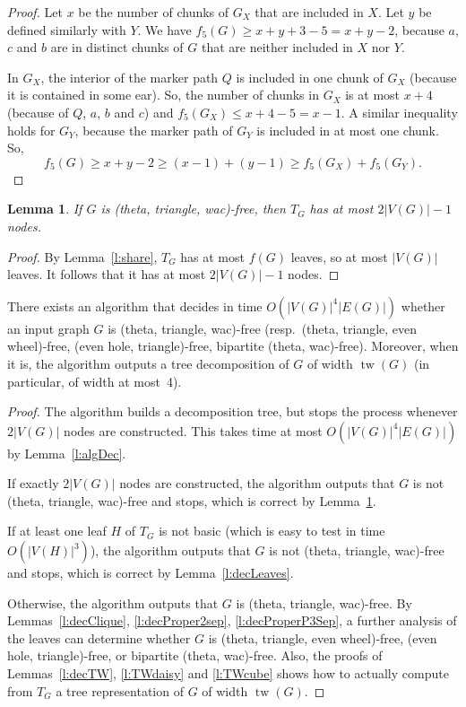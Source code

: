 \documentclass[11pt]{article}
\newtheorem{lemma}[theo]{Lemma}
\DeclareMathOperator{\tw}{tw}
\begin{document}
\begin{proof}
  Let $x$  be the number of chunks of $G_X$ that are included in $X$. Let $y$ be defined similarly with  $Y$. 
  We have $f_5(G) \geq x+y+3-5 = x + y - 2$, because $a$, $c$ and $b$ are in distinct chunks of $G$ that are neither included in $X$ nor $Y$.  

  In $G_X$, the interior of the marker path $Q$ is included in one chunk of $G_X$ (because it is contained in some ear). So, the number of chunks in $G_X$ is at most $x+4$ (because of $Q$, $a$, $b$ and $c$) and $f_5(G_X) \leq x+4 - 5 = x - 1$.  
  A similar inequality holds for $G_Y$, because the marker path of $G_Y$ is included in at most one chunk. 
  So, $$f_5(G) \geq x + y - 2 \geq (x - 1) + (y-1) \geq f_5(G_X) + f_5(G_Y).$$
\end{proof}



\begin{lemma}
  \label{l:TGnNodes}
  If $G$ is (theta, triangle, wac)-free, then $T_G$ has at most $2|V(G)| - 1$ nodes.
\end{lemma}

\begin{proof}
  By Lemma~\ref{l:share}, $T_G$ has at most $f(G)$ leaves, so at most $|V(G)|$ leaves. It follows that it has at most $2|V(G)| - 1$ nodes. 
\end{proof}


\begin{theo}
  \label{th:algo}
  There exists an algorithm that decides in time $O(|V(G)|^4|E(G)|)$ whether an input graph $G$ is (theta, triangle, wac)-free (resp.\ (theta, triangle, even wheel)-free, (even hole, triangle)-free,  bipartite (theta, wac)-free). Moreover, when it is, the algorithm outputs a tree decomposition of $G$ of width $\tw(G)$ (in particular, of width at most~4).
\end{theo}

\begin{proof}
  The algorithm builds a decomposition tree, but stops the process whenever $2|V(G)|$ nodes are constructed.  This takes time at most $O(|V(G)|^4|E(G)|)$ by Lemma~\ref{l:algDec}.  
  
  If exactly $2|V(G)|$ nodes are constructed, the algorithm outputs that $G$ is not (theta, triangle, wac)-free and stops, which is correct by Lemma~\ref{l:TGnNodes}. 
  
  If at least one leaf $H$ of $T_G$ is not basic (which is easy to test in time $O(|V(H)|^3)$), the algorithm outputs that $G$ is not (theta, triangle, wac)-free and stops, which is correct by Lemma~\ref{l:decLeaves}. 

  Otherwise, the algorithm outputs that $G$ is (theta, triangle, wac)-free.  By Lemmas~\ref{l:decClique}, \ref{l:decProper2sep}, \ref{l:decProperP3Sep}, a further analysis of the leaves can determine whether $G$ is (theta, triangle, even wheel)-free, (even hole, triangle)-free,  or bipartite (theta, wac)-free. 
  Also, the proofs of Lemmas~\ref{l:decTW}, \ref{l:TWdaisy} and \ref{l:TWcube} shows how to actually compute from $T_G$ a tree representation of $G$ of width $\tw(G)$. 
\end{proof}
\end{document}
